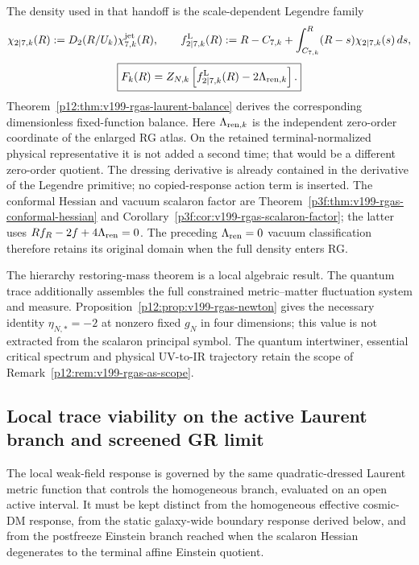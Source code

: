 \documentclass[12pt,a4paper]{article}
\begin{document}
The density used in that handoff is the scale-dependent Legendre family
\[
 \chi_{2\mid7,k}(R)
 :=D_2(R/U_k)\chi_{7,k}^{\rm jet}(R),\qquad
 f^{{\rm L}}_{2\mid7,k}(R)
 :=R-C_{7,k}+\int_{C_{7,k}}^R(R-s)\chi_{2\mid7,k}(s)\,ds,
\]
\[
 \boxed{F_k(R)=Z_{N,k}\left[f^{{\rm L}}_{2\mid7,k}(R)
 -2\Lambda_{{\rm ren},k}\right].}
\]
Theorem~\ref{p12:thm:v199-rgas-laurent-balance} derives the corresponding
dimensionless fixed-function balance.  Here \(\Lambda_{{\rm ren},k}\) is the
independent zero-order coordinate of the enlarged RG atlas.  On the retained
terminal-normalized physical representative it is not added a second time;
that would be a different zero-order quotient.  The dressing derivative is
already contained in the derivative of the Legendre primitive; no
copied-response action term is inserted.
The conformal Hessian and vacuum scalaron factor are
Theorem~\ref{p3f:thm:v199-rgas-conformal-hessian} and
Corollary~\ref{p3f:cor:v199-rgas-scalaron-factor}; the latter uses
\(Rf_R-2f+4\Lambda_{\rm ren}=0\).
The preceding \(\Lambda_{\rm ren}=0\) vacuum classification therefore
retains its original domain when the full density enters RG.

The hierarchy restoring-mass theorem is a local algebraic result.
The quantum trace additionally assembles the full constrained
metric--matter fluctuation system and measure.
Proposition~\ref{p12:prop:v199-rgas-newton} gives the necessary identity
\(\eta_{N,*}=-2\) at nonzero fixed \(g_N\) in four dimensions; this value
is not extracted from the scalaron principal symbol.
The quantum intertwiner, essential critical spectrum and physical
UV-to-IR trajectory retain the scope of
Remark~\ref{p12:rem:v199-rgas-as-scope}.


\subsection{Local trace viability on the active Laurent branch and screened GR limit}
\label{p8:sec:smooth-local-viability-screening}

The local weak-field response is governed by the same quadratic-dressed Laurent
metric function that controls the homogeneous branch, evaluated on an open
active interval.  It must be kept distinct from the homogeneous effective
cosmic-DM response, from the static galaxy-wide boundary
response derived below, and from the postfreeze Einstein branch reached when the
scalaron Hessian degenerates to the terminal affine Einstein quotient.
\end{document}
